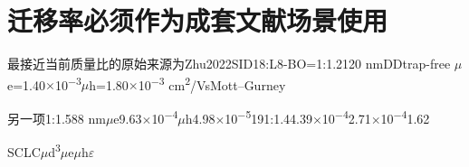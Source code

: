 \documentclass[11pt,a4paper]{article}
\begin{document}
\section{{\cjkfont 迁移率必须作为成套文献场景使用}\allowbreak{}}\label{sec:38}
{\cjkfont 最接近当前质量比的原始来源为}\allowbreak{}Zhu\allowbreak{}2022\allowbreak{}SI\allowbreak{}D18:L8-BO=\allowbreak{}1:1.2\allowbreak{}120 nm\allowbreak{}DD\allowbreak{}trap-free \ensuremath{\mu}e=\allowbreak{}1.40\ensuremath{\times}10\textsuperscript{−3}\allowbreak{}\ensuremath{\mu}h=\allowbreak{}1.80\ensuremath{\times}10\textsuperscript{−3} cm\textsuperscript{2}/Vs\allowbreak{}Mott–Gurney\allowbreak{}
\par
{\cjkfont 另一项}\allowbreak{}1:1.5\allowbreak{}88 nm\allowbreak{}\ensuremath{\mu}e\allowbreak{}9.63\ensuremath{\times}10\textsuperscript{−4}\allowbreak{}\ensuremath{\mu}h\allowbreak{}4.98\ensuremath{\times}10\textsuperscript{−5}\allowbreak{}19\allowbreak{}1:1.4\allowbreak{}4.39\ensuremath{\times}10\textsuperscript{−4}\allowbreak{}2.71\ensuremath{\times}10\textsuperscript{−4}\allowbreak{}1.62\allowbreak{}
\par
SCLC\allowbreak{}\ensuremath{\mu}\allowbreak{}d\textsuperscript{3}\allowbreak{}\ensuremath{\mu}e\allowbreak{}\ensuremath{\mu}h\allowbreak{}\ensuremath{\varepsilon}\allowbreak{}
\par
\end{document}
